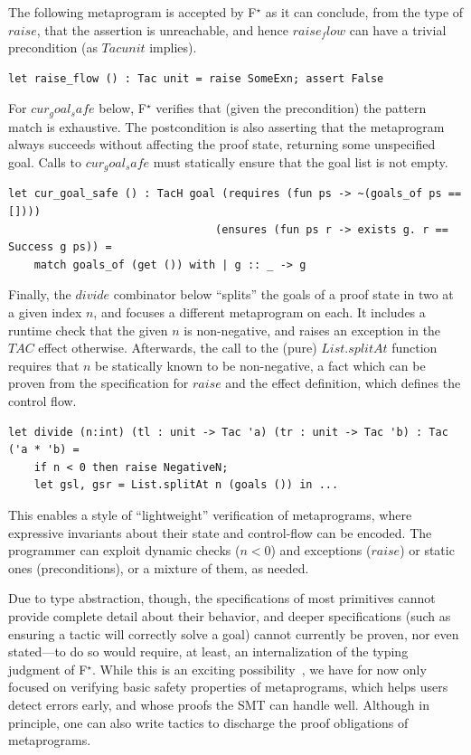 \documentclass[runningheads]{llncs}
\newcommand\fstar{F$^\star$\xspace}
\newcommand{\comm}[3]{\ifcheckpagebudget\else\ifdraft{{\color{#1}[#2: #3]}}\fi\fi}
\newcommand{\ch}[1]{\comm{teal}{CH}{#1}}
\begin{document}
The following metaprogram is accepted by \fstar as it can conclude,
from the type of \ls$raise$, that the assertion is unreachable, and
hence \ls$raise_flow$ can have a trivial precondition (as \ls$Tac unit$
implies).
%
\begin{lstlisting}
let raise_flow () : Tac unit = raise SomeExn; assert False
\end{lstlisting}
%
For \ls$cur_goal_safe$ below, \fstar verifies that (given the precondition)
the pattern match is exhaustive.
%
The postcondition is also asserting that the metaprogram always succeeds
without affecting the proof state, returning some unspecified goal.
%
Calls to \ls$cur_goal_safe$ must statically ensure that the goal list is
not empty.
%
\begin{lstlisting}
let cur_goal_safe () : TacH goal (requires (fun ps -> ~(goals_of ps == [])))
                                (ensures (fun ps r -> exists g. r == Success g ps)) =
    match goals_of (get ()) with | g :: _ -> g
\end{lstlisting}
%
Finally, the \ls$divide$ combinator below ``splits'' the goals of a
proof state in two at a given index \ls$n$, and focuses a different
metaprogram on each.
%
It includes a runtime check that the given \ls$n$ is non-negative,
and raises an exception in the \ls$TAC$ effect otherwise.
%
Afterwards, the call to the (pure) \ls$List.splitAt$ function
requires that \ls$n$ be statically known to be non-negative,
a fact which can be proven from the specification for
\ls$raise$ and the effect definition, which defines
the control flow.
%
\begin{lstlisting}
let divide (n:int) (tl : unit -> Tac 'a) (tr : unit -> Tac 'b) : Tac ('a * 'b) =
    if n < 0 then raise NegativeN;
    let gsl, gsr = List.splitAt n (goals ()) in ...
\end{lstlisting}
%
This enables a style of ``lightweight'' verification of metaprograms,
where expressive invariants about their state and control-flow can be
encoded.
%
The programmer can exploit dynamic checks (\ls$n < 0$) and exceptions
(\ls$raise$) or static ones (preconditions), or a mixture of them, as
needed.


Due to type abstraction, though, the specifications of most primitives cannot provide
complete detail about their behavior, and deeper specifications (such as
ensuring a tactic will correctly solve a goal) cannot currently be proven,
nor even stated---to do so would require, at least, an internalization
of the typing judgment of \fstar.
%
While this is an exciting possibility~\cite{AnandBCST18},
we have for now only focused on
verifying basic safety properties of metaprograms, which helps users
detect errors early, and whose proofs the SMT can handle well.
%
Although in principle, one can also write tactics to
discharge the proof obligations of metaprograms.
\end{document}
